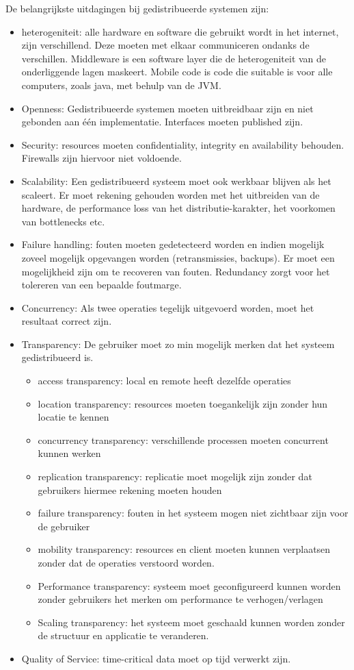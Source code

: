 \documentclass[../samenvatting.tex]{subfiles}
\begin{document}
De belangrijkste uitdagingen bij gedistribueerde systemen zijn:
\begin{itemize}
	\item heterogeniteit: alle hardware en software die gebruikt wordt in het internet, zijn verschillend. Deze moeten met elkaar communiceren ondanks de verschillen. Middleware is een software layer die de heterogeniteit van de onderliggende lagen maskeert. Mobile code is code die suitable is voor alle computers, zoals java, met behulp van de JVM.
	\item Openness: Gedistribueerde systemen moeten uitbreidbaar zijn en niet gebonden aan één implementatie. Interfaces moeten published zijn.
	\item Security: resources moeten confidentiality, integrity en availability behouden. Firewalls zijn hiervoor niet voldoende.
	\item Scalability: Een gedistribueerd systeem moet ook werkbaar blijven als het scaleert. Er moet rekening gehouden worden met het uitbreiden van de hardware, de performance loss van het distributie-karakter, het voorkomen van bottlenecks etc.
	\item Failure handling: fouten moeten gedetecteerd worden en indien mogelijk zoveel mogelijk opgevangen worden (retransmissies, backups). Er moet een mogelijkheid zijn om te recoveren van fouten. Redundancy zorgt voor het tolereren van een bepaalde foutmarge.
	\item Concurrency: Als twee operaties tegelijk uitgevoerd worden, moet het resultaat correct zijn. 
	\item Transparency: De gebruiker moet zo min mogelijk merken dat het systeem gedistribueerd is.
	\begin{itemize}
		\item access transparency: local en remote heeft dezelfde operaties
		\item location transparency: resources moeten toegankelijk zijn zonder hun locatie te kennen
		\item concurrency transparency: verschillende processen moeten concurrent kunnen werken
		\item replication transparency: replicatie moet mogelijk zijn zonder dat gebruikers hiermee rekening moeten houden
		\item failure transparency: fouten in het systeem mogen niet zichtbaar zijn voor de gebruiker
		\item mobility transparency: resources en client moeten kunnen verplaatsen zonder dat de operaties verstoord worden.
		\item Performance transparency: systeem moet geconfigureerd kunnen worden zonder gebruikers het merken om performance te verhogen/verlagen
		\item Scaling transparency: het systeem moet geschaald kunnen worden zonder de structuur en applicatie te veranderen.
	\end{itemize}
	\item Quality of Service: time-critical data moet op tijd verwerkt zijn.
\end{itemize}
\end{document}

